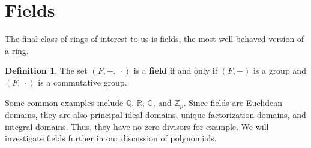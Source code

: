 \documentclass[11pt]{amsart}
\theoremstyle{definition}
\newtheorem{definition}[theorem]{Definition}
\newcommand{\complexNumbers}{\mathbb{C}}
\newcommand{\reals}{\mathbb{R}}
\newcommand{\rationals}{\mathbb{Q}}
\newcommand{\integers}{\mathbb{Z}}
\begin{document}
\section{Fields}
The final class of rings of interest to us is fields, the most well-behaved version of a ring.
\begin{definition}
	The set $(F, +, \, \cdot)$ is a \textbf{field} if and only if $(F, +)$ is a group and $(F, \, \cdot)$ is a commutative group.
\end{definition}
Some common examples include $\rationals$, $\reals$, $\complexNumbers$, and 
$\integers_{p}$. Since fields are Euclidean domains, they are also principal ideal domains, unique factorization domains, and integral domains.
Thus, they have no-zero divisors for example. We will investigate fields further in our discussion of polynomials.
\newpage
\end{document}
